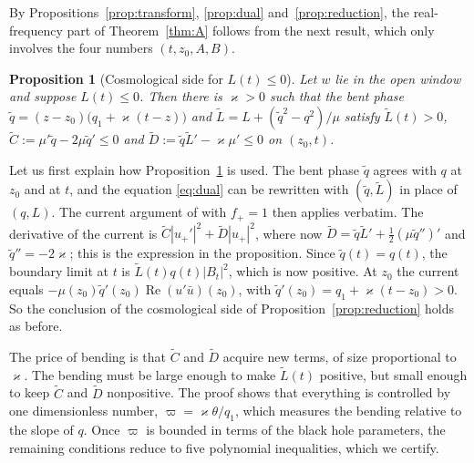 \documentclass[11pt]{amsart}
\newtheorem{proposition}[theorem]{Proposition}
\theoremstyle{definition}
\theoremstyle{remark}
\numberwithin{equation}{section}
\renewcommand{\Re}{\operatorname{Re}}
\begin{document}
By Propositions~\ref{prop:transform}, \ref{prop:dual} and~\ref{prop:reduction}, the real-frequency part of
Theorem~\ref{thm:A} follows from the next result, which only involves the four numbers $(t,z_0,A,B)$.

\begin{proposition}[Cosmological side for $L(t)\le0$]\label{hyp:cos}
Let $w$ lie in the open window and suppose $L(t)\le0$. Then there is $\varkappa>0$ such that the bent phase
$\tilde q=(z-z_0)\big(q_1+\varkappa(t-z)\big)$ and $\tilde L=L+(\tilde q^2-q^2)/\mu$ satisfy $\tilde L(t)>0$,
$\tilde C:=\mu'\tilde q-2\mu\tilde q'\le0$ and $\tilde D:=\tilde q\tilde L'-\varkappa\mu'\le0$ on $(z_0,t)$.
\end{proposition}

Let us first explain how Proposition~\ref{hyp:cos} is used. The bent phase $\tilde q$ agrees with $q$ at $z_0$ and at
$t$, and the equation \eqref{eq:dual} can be rewritten with $(\tilde q,\tilde L)$ in place of $(q,L)$. The current
argument of \cite[Lemma~4.1, \S7]{Hin26} with $f_+=1$ then applies verbatim. The derivative of the current is
$\tilde C|u_+'|^2+\tilde D|u_+|^2$, where now $\tilde D=\tilde q\tilde L'+\frac12(\mu\tilde q'')'$ and
$\tilde q''=-2\varkappa$; this is the expression in the proposition. Since $\tilde q(t)=q(t)$, the boundary limit at
$t$ is $\tilde L(t)q(t)|B_t|^2$, which is now positive. At $z_0$ the current equals
$-\mu(z_0)\tilde q'(z_0)\Re(u'\bar u)(z_0)$, with $\tilde q'(z_0)=q_1+\varkappa(t-z_0)>0$. So the conclusion of the
cosmological side of Proposition~\ref{prop:reduction} holds as before.

The price of bending is that $\tilde C$ and $\tilde D$ acquire new terms, of size proportional to $\varkappa$. The
bending must be large enough to make $\tilde L(t)$ positive, but small enough to keep $\tilde C$ and $\tilde D$
nonpositive. The proof shows that everything is controlled by one dimensionless number, $\varpi=\varkappa\theta/q_1$,
which measures the bending relative to the slope of $q$. Once $\varpi$ is bounded in terms of the black hole
parameters, the remaining conditions reduce to five polynomial inequalities, which we certify.
\end{document}
